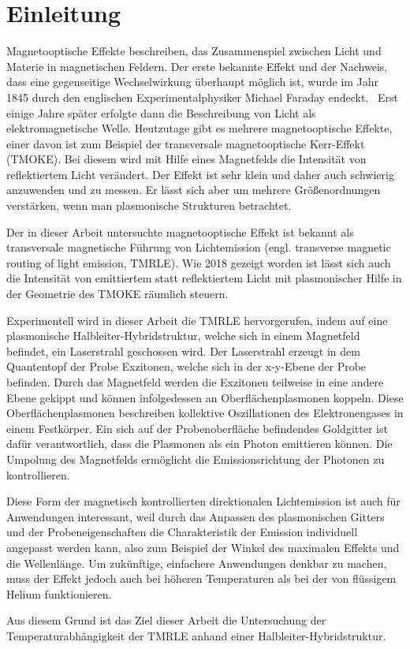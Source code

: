 \chapter{Einleitung}
Magnetooptische Effekte beschreiben, das Zusammenspiel zwischen Licht und Materie in magnetischen Feldern. 
Der erste bekannte Effekt und der Nachweis, dass eine gegenseitige Wechselwirkung überhaupt möglich ist, 
wurde im Jahr 1845 durch den englischen Experimentalphysiker Michael Faraday endeckt.~\cite{michi}
Erst einige Jahre später erfolgte dann die Beschreibung von Licht als elektromagnetische Welle.
Heutzutage gibt es mehrere magnetooptische Effekte, einer davon ist zum Beispiel der
transversale magnetooptische Kerr-Effekt (TMOKE). 
Bei diesem wird mit Hilfe eines Magnetfelds die Intensität von reflektiertem Licht verändert.
Der Effekt ist sehr klein und daher auch schwierig anzuwenden und zu messen. 
Er lässt sich aber um mehrere Größenordnungen verstärken, wenn man plasmonische Strukturen betrachtet.~\cite{kerr,kerr2} 

Der in dieser Arbeit untersuchte magnetooptische Effekt ist bekannt als transversale magnetische Führung von Lichtemission (engl.
transverse magnetic routing of light emission, TMRLE).
Wie 2018 gezeigt worden ist lässt sich auch die Intensität von emittiertem 
statt reflektiertem Licht mit plasmonischer Hilfe in der Geometrie des TMOKE räumlich steuern.~\cite{allg_paper}

Experimentell wird in dieser Arbeit die TMRLE hervorgerufen, indem auf eine plasmonische
Halbleiter-Hybridstruktur, welche sich in einem Magnetfeld befindet, ein Laserstrahl geschossen wird.
Der Laserstrahl erzeugt in dem Quantentopf der Probe Exzitonen, welche sich in der x-y-Ebene der
Probe befinden. 
Durch das Magnetfeld werden die Exzitonen teilweise in eine andere Ebene gekippt und
können infolgedessen an Oberflächenplasmonen koppeln.
Diese Oberflächenplasmonen beschreiben kollektive Oszillationen des Elektronengases in einem Festkörper. 
Ein sich auf der Probenoberfläche befindendes Goldgitter ist dafür verantwortlich, 
dass die Plasmonen als ein Photon emittieren können.
Die Umpolung des Magnetfelds ermöglicht die Emissionsrichtung der Photonen 
zu kontrollieren.

Diese Form der magnetisch kontrollierten direktionalen Lichtemission ist auch für Anwendungen interessant, 
weil durch das Anpassen des 
plasmonischen Gitters und der Probeneigenschaften die Charakteristik der Emission individuell angepasst werden kann, 
also zum Beispiel der Winkel des maximalen Effekts und die Wellenlänge. 
Um zukünftige, einfachere Anwendungen denkbar zu machen, 
muss der Effekt jedoch auch bei höheren Temperaturen als bei der von flüssigem Helium funktionieren.

Aus diesem Grund ist das Ziel dieser Arbeit die Untersuchung der Temperaturabhängigkeit
der TMRLE anhand einer Halbleiter-Hybridstruktur.